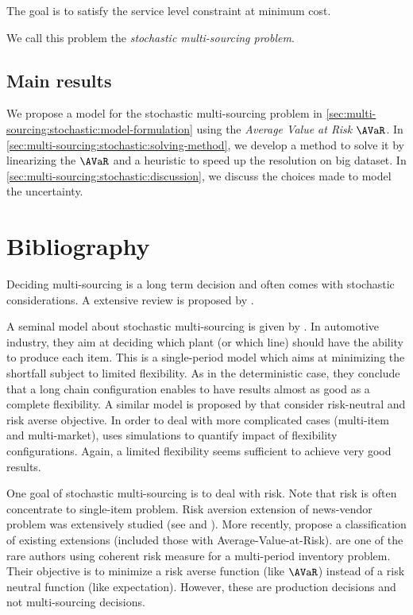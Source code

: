 The goal is to satisfy the service level constraint at minimum cost.


We call this problem the \emph{stochastic multi-sourcing problem}.


\subsection{Main results}
\label{sec:multi-sourcing:stochastic:introduction:main-results}


We propose a model for the stochastic multi-sourcing problem in \cref{sec:multi-sourcing:stochastic:model-formulation} using the \emph{Average Value at Risk $\AVaR$}.
In \cref{sec:multi-sourcing:stochastic:solving-method}, we develop a method to solve it by linearizing the $\AVaR$ and a heuristic to speed up the resolution on big dataset.
In \cref{sec:multi-sourcing:stochastic:discussion}, we discuss the choices made to model the uncertainty.



\section{Bibliography}
\label{sec:multi-sourcing:stochastic:bibliography}


Deciding multi-sourcing is a long term decision and often comes with stochastic considerations.
A extensive review is proposed by \citet{Yao2017}.


A seminal model about stochastic multi-sourcing is given by \citet{Jordan1995}.
In automotive industry, they aim at deciding which plant (or which line) should have the ability to produce each item.
This is a single-period model which aims at minimizing the shortfall subject to limited flexibility.
As in the deterministic case, they conclude that a long chain configuration enables to have results almost as good as a complete flexibility.
A similar model is proposed by \citet{Brian2005} that consider risk-neutral and risk averse objective.
In order to deal with more complicated cases (multi-item and multi-market), \citet{Garavelli2003} uses simulations to quantify impact of flexibility configurations.
Again, a limited flexibility seems sufficient to achieve very good results.


One goal of stochastic multi-sourcing is to deal with risk.
Note that risk is often concentrate to single-item problem.
Risk aversion extension of news-vendor problem was extensively studied (see \citet{Vipul2000} and \citet{Choi2008}).
More recently, \citet{Arikan2017} propose a classification of existing extensions (included those with Average-Value-at-Risk).
\citet{Ahmed2007} are one of the rare authors using coherent risk measure for a multi-period inventory problem.
Their objective is to minimize a risk averse function (like $\AVaR$) instead of a risk neutral function (like expectation).
However, these are production decisions and not multi-sourcing decisions.


